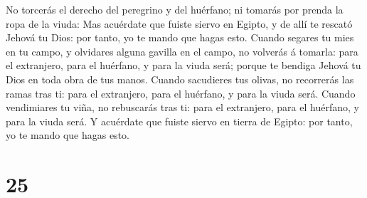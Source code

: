 No torcerás el derecho del peregrino y del huérfano; ni tomarás por
prenda la ropa de la viuda:  Mas acuérdate que fuiste
siervo en Egipto, y de allí te rescató Jehová tu Dios: por tanto, yo te
mando que hagas esto.  Cuando segares tu mies en tu campo,
y olvidares alguna gavilla en el campo, no volverás á tomarla: para el
extranjero, para el huérfano, y para la viuda será; porque te bendiga
Jehová tu Dios en toda obra de tus manos.  Cuando
sacudieres tus olivas, no recorrerás las ramas tras ti: para el
extranjero, para el huérfano, y para la viuda será.  Cuando
vendimiares tu viña, no rebuscarás tras ti: para el extranjero, para el
huérfano, y para la viuda será.  Y acuérdate que fuiste
siervo en tierra de Egipto: por tanto, yo te mando que hagas esto.

\hypertarget{section-24}{%
\section{25}\label{section-24}}

